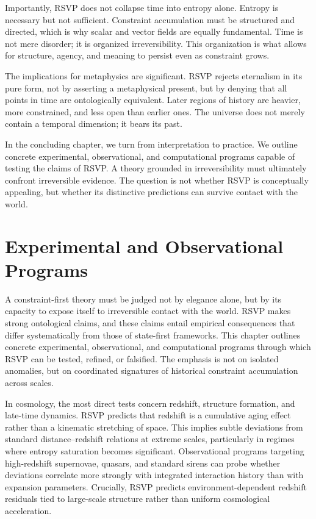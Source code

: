 \documentclass[11pt,oneside]{book}
\begin{document}
Importantly, RSVP does not collapse time into entropy alone. Entropy is necessary but not sufficient. Constraint accumulation must be structured and directed, which is why scalar and vector fields are equally fundamental. Time is not mere disorder; it is organized irreversibility. This organization is what allows for structure, agency, and meaning to persist even as constraint grows.

The implications for metaphysics are significant. RSVP rejects eternalism in its pure form, not by asserting a metaphysical present, but by denying that all points in time are ontologically equivalent. Later regions of history are heavier, more constrained, and less open than earlier ones. The universe does not merely contain a temporal dimension; it bears its past.

In the concluding chapter, we turn from interpretation to practice. We outline concrete experimental, observational, and computational programs capable of testing the claims of RSVP. A theory grounded in irreversibility must ultimately confront irreversible evidence. The question is not whether RSVP is conceptually appealing, but whether its distinctive predictions can survive contact with the world.

\chapter{Experimental and Observational Programs}

A constraint-first theory must be judged not by elegance alone, but by its capacity to expose itself to irreversible contact with the world. RSVP makes strong ontological claims, and these claims entail empirical consequences that differ systematically from those of state-first frameworks. This chapter outlines concrete experimental, observational, and computational programs through which RSVP can be tested, refined, or falsified. The emphasis is not on isolated anomalies, but on coordinated signatures of historical constraint accumulation across scales.

In cosmology, the most direct tests concern redshift, structure formation, and late-time dynamics. RSVP predicts that redshift is a cumulative aging effect rather than a kinematic stretching of space. This implies subtle deviations from standard distance–redshift relations at extreme scales, particularly in regimes where entropy saturation becomes significant. Observational programs targeting high-redshift supernovae, quasars, and standard sirens can probe whether deviations correlate more strongly with integrated interaction history than with expansion parameters. Crucially, RSVP predicts environment-dependent redshift residuals tied to large-scale structure rather than uniform cosmological acceleration.
\end{document}
